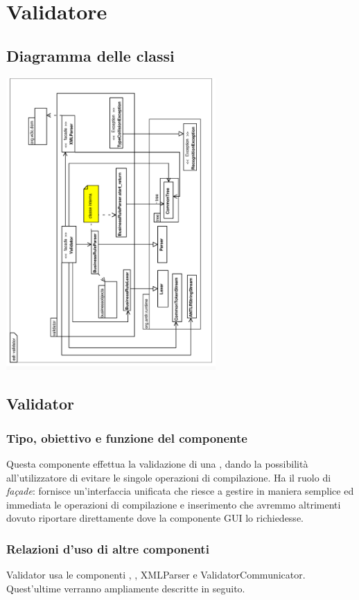 \documentclass[11pt,titlepage,a4paper]{report}
\begin{document}
\section{Validatore}
\subsection{Diagramma delle classi}
\begin{center}
\includegraphics[width=0.6\textwidth, angle=-90]{DiagrammaClassi/validator.eps}
\end{center}
\subsection{Validator}%
\subsubsection{Tipo, obiettivo e funzione del componente}
Questa componente effettua la validazione di una \br, dando la possibilit\`a all'utilizzatore di evitare le singole operazioni di compilazione. Ha il ruolo di \textit{fa\c{c}ade}: fornisce un'interfaccia unificata che riesce a gestire in maniera semplice ed immediata le operazioni di compilazione e inserimento che avremmo altrimenti dovuto riportare direttamente dove la componente GUI lo richiedesse.
\subsubsection{Relazioni d'uso di altre componenti}
Validator usa le componenti \brp, \brl, XMLParser e ValidatorCommunicator. Quest'ultime verranno ampliamente descritte in seguito.
\end{document}
